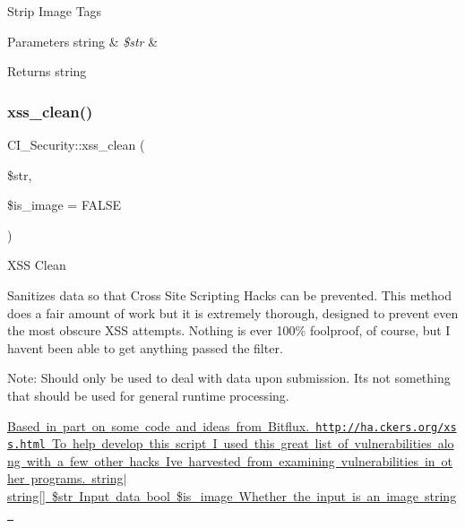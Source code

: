 Strip Image Tags


\begin{DoxyParams}[1]{Parameters}
string & {\em \$str} & \\
\hline
\end{DoxyParams}
\begin{DoxyReturn}{Returns}
string 
\end{DoxyReturn}
\mbox{\label{class_c_i___security_a2a5bb2a641bd37cbae73a96ee35dee30}} 
\subsubsection{\texorpdfstring{xss\+\_\+clean()}{xss\_clean()}}
{\footnotesize\ttfamily C\+I\+\_\+\+Security\+::xss\+\_\+clean (\begin{DoxyParamCaption}\item[{}]{\$str,  }\item[{}]{\$is\+\_\+image = {\ttfamily FALSE} }\end{DoxyParamCaption})}

X\+SS Clean

Sanitizes data so that Cross Site Scripting Hacks can be prevented. This method does a fair amount of work but it is extremely thorough, designed to prevent even the most obscure X\+SS attempts. Nothing is ever 100\% foolproof, of course, but I haven\textquotesingle{}t been able to get anything passed the filter.

Note\+: Should only be used to deal with data upon submission. It\textquotesingle{}s not something that should be used for general runtime processing.

\mbox{\hyperlink{}{Based in part on some code and ideas from Bitflux.  \href{http://ha.ckers.org/xss.html}{\tt http\+://ha.\+ckers.\+org/xss.\+html} To help develop this script I used this great list of vulnerabilities along with a few other hacks I\textquotesingle{}ve harvested from examining vulnerabilities in other programs.  string$\vert$string\mbox{[}\mbox{]} \$str Input data  bool \$is\+\_\+image Whether the input is an image  string }}\mbox{\label{class_c_i___security_ab1eb7d9ec864e80628da033de0ecef22}} 

